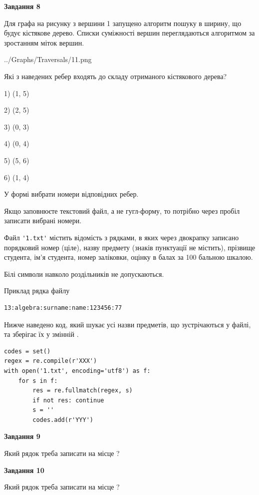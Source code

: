 \documentclass[12pt, ukrainian]{article}
\def\code#1{\Verb!#1!}
\begin{document}
{\begin {large}
{\begin {center}\textbf{Завдання 8}\end {center}}\par
Для графа на рисунку з вершини 1 запущено алгоритм пошуку в ширину, що будує кістякове дерево. Списки суміжності вершин переглядаються алгоритмом за зростанням міток вершин.\par
\begin{center}
	{../Graphs/Traversals/11.png}
\end{center}
\par Які з наведених ребер входять до складу отриманого кістякового дерева?\par
1) (1, 5)\par
2) (2, 5)\par
3) (0, 3)\par
4) (0, 4)\par
5) (5, 6)\par
6) (1, 4)\par
{\vskip 15pt} У формі вибрати номери відповідних ребер.


Якщо заповнюєте текстовий файл, а не гугл-форму, то потрібно через пробіл записа\-ти вибрані номери.\par
\newpage


Файл \code{'1.txt'} містить відомість з рядками, в яких через двокрапку записано поряд\-ковий номер (ціле), назву предмету (знаків пунктуації не містить), прізвище студента, ім'я студента, номер заліковки, оцінку в балах за 100 бальною шкалою.

Білі символи навколо роздільників не допускаються.

Приклад рядка файлу



\begin{verbatim}
13:algebra:surname:name:123456:77
\end{verbatim}


Нижче наведено код, який шукає усі назви предметів, що зустрічаються у файлі, та зберігає їх у змінній .



\begin{verbatim}
codes = set()
regex = re.compile(r'XXX')
with open('1.txt', encoding='utf8') as f:
    for s in f:
        res = re.fullmatch(regex, s)
        if not res: continue
        s = ''
        codes.add(r'YYY')
\end{verbatim}


{\begin {center}\textbf{Завдання 9}\end {center}}\par
Який рядок треба записати на місце  ?\par
\vspace{5mm}


{\begin {center}\textbf{Завдання 10}\end {center}}\par
Який рядок треба записати на місце  ?\par


\newpage


\end {large}}
\end{document}
